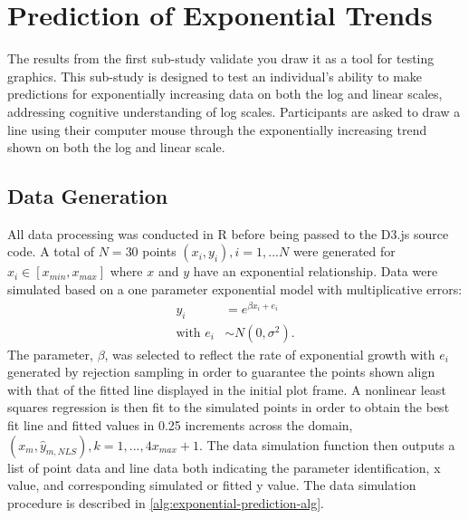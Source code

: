 \documentclass[print]{nuthesis}
\begin{document}
\hypertarget{prediction-of-exponential-trends}{%
\section{Prediction of Exponential Trends}\label{prediction-of-exponential-trends}}

The results from the first sub-study validate you draw it as a tool for testing graphics.
This sub-study is designed to test an individual's ability to make predictions for exponentially increasing data on both the log and linear scales, addressing cognitive understanding of log scales.
Participants are asked to draw a line using their computer mouse through the exponentially increasing trend shown on both the log and linear scale.

\hypertarget{data-generation-2}{%
\subsection{Data Generation}\label{data-generation-2}}

All data processing was conducted in R before being passed to the D3.js source code.
A total of \(N = 30\) points \((x_i, y_i), i = 1,...N\) were generated for \(x_i\in [x_{min}, x_{max}]\) where \(x\) and \(y\) have an exponential relationship.
Data were simulated based on a one parameter exponential model with multiplicative errors:
\begin{align}
y_i & = e^{\beta x_i + e_i} \\
\text{with } e_i & \sim N(0, \sigma^2). \nonumber
\end{align}
The parameter, \(\beta\), was selected to reflect the rate of exponential growth with \(e_i\) generated by rejection sampling in order to guarantee the points shown align with that of the fitted line displayed in the initial plot frame.
A nonlinear least squares regression is then fit to the simulated points in order to obtain the best fit line and fitted values in 0.25 increments across the domain, \((x_m, \hat y_{m,NLS}), k = 1, ..., 4 x_{max} +1\).
The data simulation function then outputs a list of point data and line data both indicating the parameter identification, x value, and corresponding simulated or fitted y value.
The data simulation procedure is described in \cref{alg:exponential-prediction-alg}.
\end{document}
